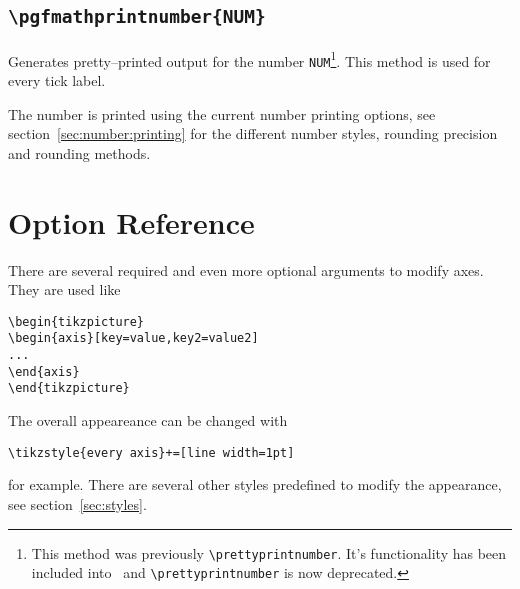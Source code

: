 \subsection{\texttt{\textbackslash pgfmathprintnumber\{NUM\}}}
Generates pretty--printed output for the number \texttt{NUM}\footnote{This method was previously \texttt{\textbackslash prettyprintnumber}. It's functionality has been included into \PGF\ and \texttt{\textbackslash prettyprintnumber} is now deprecated.}. This method is used for every tick label.

The number is printed using the current number printing options, see section~\ref{sec:number:printing} for the different number styles, rounding precision and rounding methods.

% 
\section{Option Reference}
There are several required and even more optional arguments to modify axes. They are used like
\begin{lstlisting}
\begin{tikzpicture}
\begin{axis}[key=value,key2=value2]
...
\end{axis}
\end{tikzpicture}
\end{lstlisting}
The overall appeareance can be changed with
\begin{lstlisting}
\tikzstyle{every axis}+=[line width=1pt]
\end{lstlisting}
for example. There are several other styles predefined to modify the appearance, see section~\ref{sec:styles}.

